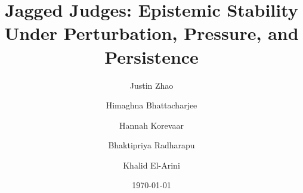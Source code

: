 \documentclass[]{fairmeta}
\title{Jagged Judges: Epistemic Stability\\Under Perturbation, Pressure, and Persistence}
\author[1]{Justin Zhao}
\author[1]{Himaghna Bhattacharjee}
\author[1]{Hannah Korevaar}
\author[2]{Bhaktipriya Radharapu}
\author[1]{Khalid El-Arini}
\affiliation[1]{Meta Superintelligence Labs}
\affiliation[2]{FAIR at Meta}
\date{\today}
\begin{document}
\maketitle










\clearpage
\newpage



\clearpage
\newpage
\beginappendix

\end{document}

